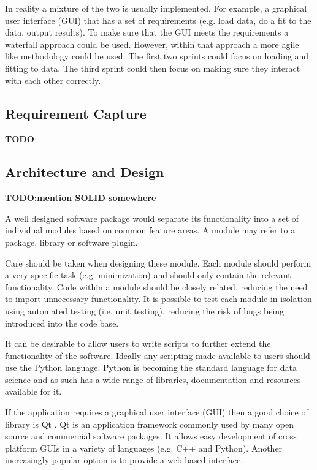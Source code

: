 \documentclass[jnr]{iosart2x}
\newcommand{\todo}[1]{\textbf{#1}}
\begin{document}
In reality a mixture of the two is usually implemented.
For example, a graphical user interface (GUI) that has a set of requirements (e.g. load data, do a fit to the data, output results).
To make sure that the GUI meets the requirements a waterfall approach could be used.
However, within that approach a more agile like methodology could be used.
The first two sprints could focus on loading and fitting to data.
The third sprint could then focus on making sure they interact with each other correctly.

\subsection{Requirement Capture}
\label{Requirements}

\todo{TODO}

\subsection{Architecture and Design}
\label{Architecture}

\todo{TODO:mention SOLID somewhere}

A well designed software package would separate its functionality into a set of individual modules based on common feature areas.
A module may refer to a package, library or software plugin.

Care should be taken when designing these module.
Each module should perform a very specific task (e.g. minimization) and should only contain the relevant functionality.
Code within a module should be closely related, reducing the need to import unnecessary functionality.
It is possible to test each module in isolation using automated testing (i.e. unit testing), reducing the risk of bugs being introduced into the code base.

It can be desirable to allow users to write scripts to further extend the functionality of the software.
Ideally any scripting made available to users should use the Python language.
Python is becoming the standard language for data science and as such has a wide range of libraries, documentation and resources available for it.

If the application requires a graphical user interface (GUI) then a good choice of library is Qt \cite{Qt}.
Qt is an application framework commonly used by many open source and commercial software packages.
It allows easy development of cross platform GUIs in a variety of languages (e.g. C++ and Python).
Another increasingly popular option is to provide a web based interface.
\end{document}
